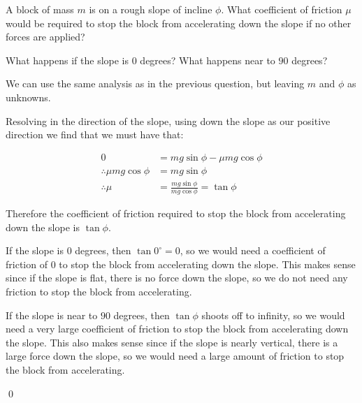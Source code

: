 \begin{example}
    A block of mass $m$ is on a rough slope of incline $\phi$. What coefficient of friction $\mu$ would be required to stop the block from accelerating down the slope if no other forces are applied?

    What happens if the slope is $0$ degrees? What happens near to $90$ degrees?
\end{example}
\begin{solution}
    We can use the same analysis as in the previous question, but leaving $m$ and $\phi$ as unknowns. 

    Resolving in the direction of the slope, using down the slope as our positive direction we find that we must have that:

    \begin{align*}
        0 &= mg \sin \phi - \mu mg \cos \phi \\
        \therefore \mu mg \cos \phi &= mg \sin \phi \\
        \therefore \mu &= \frac{mg \sin \phi}{mg \cos \phi} = \tan \phi
    \end{align*}

    Therefore the coefficient of friction required to stop the block from accelerating down the slope is $\tan \phi$.

    If the slope is $0$ degrees, then $\tan 0^\circ = 0$, so we would need a coefficient of friction of $0$ to stop the block from accelerating down the slope. This makes sense since if the slope is flat, there is no force down the slope, so we do not need any friction to stop the block from accelerating.

    If the slope is near to $90$ degrees, then $\tan \phi$ shoots off to infinity, so we would need a very large coefficient of friction to stop the block from accelerating down the slope. This also makes sense since if the slope is nearly vertical, there is a large force down the slope, so we would need a large amount of friction to stop the block from accelerating.
    
    \qed
\end{solution}
